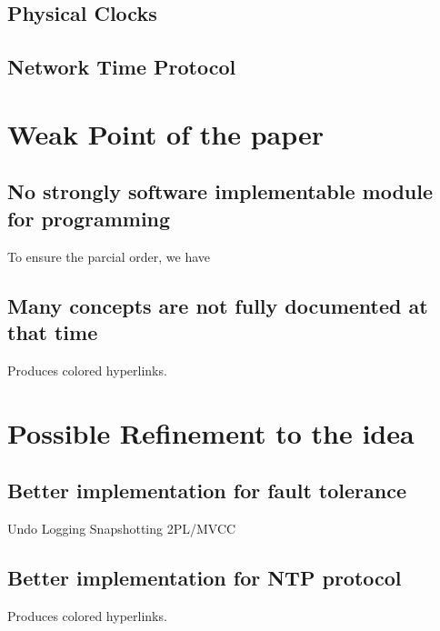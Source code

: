 \documentclass[acmlarge]{acmart}
\begin{document}
\subsection{Physical Clocks}

\subsection{Network Time Protocol}



\section{Weak Point of the paper}
\subsection {No strongly software implementable module for programming} To ensure the parcial order, we have
\subsection{Many concepts are not fully documented at that time} Produces colored hyperlinks.


\section{Possible Refinement to the idea}

\subsection {Better implementation for fault tolerance}
Undo Logging
Snapshotting
2PL/MVCC
\subsection{Better implementation for NTP protocol} Produces colored hyperlinks.\cite{HFT-PTP-NTP} %





\end{document}
